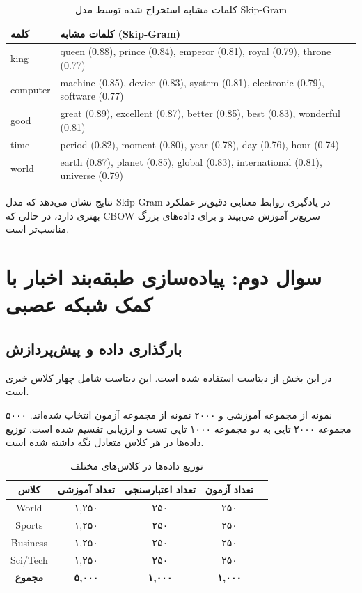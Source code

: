 \documentclass[12pt,a4paper]{article}
\begin{document}
\begin{table}[H]
\centering
\small
\begin{tabular}{|p{}|p{}|}
\hline
\textbf{کلمه} & \textbf{کلمات مشابه (Skip-Gram)} \\
\hline
king & queen (0.88), prince (0.84), emperor (0.81), royal (0.79), throne (0.77) \\
computer & machine (0.85), device (0.83), system (0.81), electronic (0.79), software (0.77) \\
good & great (0.89), excellent (0.87), better (0.85), best (0.83), wonderful (0.81) \\
time & period (0.82), moment (0.80), year (0.78), day (0.76), hour (0.74) \\
world & earth (0.87), planet (0.85), global (0.83), international (0.81), universe (0.79) \\
\hline
\end{tabular}
\caption{کلمات مشابه استخراج شده توسط مدل Skip-Gram}
\end{table}

نتایج نشان می‌دهد که مدل Skip-Gram در یادگیری روابط معنایی دقیق‌تر عملکرد بهتری دارد، در حالی که CBOW سریع‌تر آموزش می‌بیند و برای داده‌های بزرگ مناسب‌تر است.

\section{سوال دوم: پیاده‌سازی طبقه‌بند اخبار با کمک شبکه عصبی}

\subsection{بارگذاری داده و پیش‌پردازش}
در این بخش از دیتاست  استفاده شده است. این دیتاست شامل چهار کلاس خبری  است.

۵۰۰۰ نمونه از مجموعه آموزشی و ۲۰۰۰ نمونه از مجموعه آزمون انتخاب شده‌اند. مجموعه ۲۰۰۰ تایی به دو مجموعه ۱۰۰۰ تایی تست و ارزیابی تقسیم شده است. توزیع داده‌ها در هر کلاس متعادل نگه داشته شده است.

\begin{table}[H]
\centering
\begin{tabular}{|c|c|c|c|c|}
\hline
\textbf{کلاس} & \textbf{تعداد آموزشی} & \textbf{تعداد اعتبارسنجی} & \textbf{تعداد آزمون} \\
\hline
World & ۱,۲۵۰ & ۲۵۰ & ۲۵۰ \\
Sports & ۱,۲۵۰ & ۲۵۰ & ۲۵۰ \\
Business & ۱,۲۵۰ & ۲۵۰ & ۲۵۰ \\
Sci/Tech & ۱,۲۵۰ & ۲۵۰ & ۲۵۰ \\
\hline
\textbf{مجموع} & \textbf{۵,۰۰۰} & \textbf{۱,۰۰۰} & \textbf{۱,۰۰۰} \\
\hline
\end{tabular}
\caption{توزیع داده‌ها در کلاس‌های مختلف}
\end{table}
\end{document}
